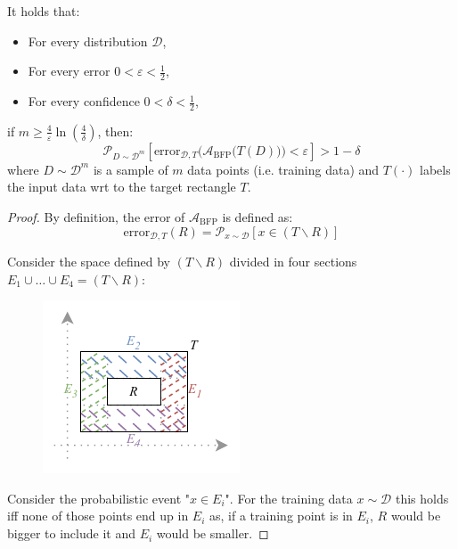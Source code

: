 \begin{example}
    \begin{theorem}
        It holds that:
        \begin{itemize}
            \item For every distribution $\mathcal{D}$,
            \item For every error $0 < \varepsilon < \frac{1}{2}$, 
            \item For every confidence $0 < \delta < \frac{1}{2}$,
        \end{itemize} 
        if $m \geq \frac{4}{\varepsilon}\ln\left( \frac{4}{\delta} \right)$, then:
        \[ 
            \mathcal{P}_{D \sim \mathcal{D}^m}
                \left[ \text{error}_{\mathcal{D}, T}\Big( \mathcal{A}_\text{BFP}\big(T(D)\big) \Big) < \varepsilon \right]  > 1 - \delta
        \]
        where $D \sim \mathcal{D}^m$ is a sample of $m$ data points (i.e. training data)
        and $T(\cdot)$ labels the input data wrt to the target rectangle $T$.

        \begin{proof}
            By definition, the error of $\mathcal{A}_\text{BFP}$ is defined as:
            \[ \text{error}_{\mathcal{D}, T}(R) = \mathcal{P}_{x \sim \mathcal{D}} [ x \in (T \smallsetminus R) ] \]

            Consider the space defined by $(T \smallsetminus R)$ divided in four sections $E_1 \cup \dots \cup E_4 = (T \smallsetminus R)$:
            \begin{figure}[H]
                \centering
                \includegraphics[width=0.4\linewidth]{./img/_rectangle_space.pdf}
            \end{figure}

            Consider the probabilistic event "$x \in E_i$".
            For the training data $x \sim \mathcal{D}$ this holds iff none of those points
            end up in $E_i$ as, if a training point is in $E_i$, $R$ would be bigger to include it and $E_i$ would be smaller.


\end{proof}
\end{theorem}
\end{example}
